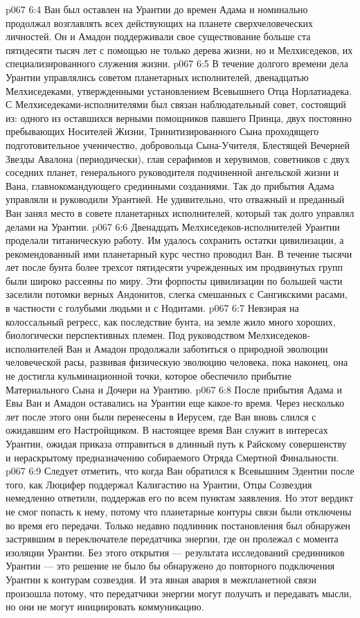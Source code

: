 \vs p067 6:4 Ван был оставлен на Урантии до времен Адама и номинально продолжал возглавлять всех действующих на планете сверхчеловеческих личностей. Он и Амадон поддерживали свое существование больше ста пятидесяти тысяч лет с помощью не только дерева жизни, но и Мелхиседеков, их специализированного служения жизни.
\vs p067 6:5 \pc В течение долгого времени дела Урантии управлялись советом планетарных исполнителей, двенадцатью Мелхиседеками, утвержденными установлением Всевышнего Отца Норлатиадека. С Мелхиседеками\hyp{}исполнителями был связан наблюдательный совет, состоящий из: одного из оставшихся верными помощников павшего Принца, двух постоянно пребывающих Носителей Жизни, Тринитизированного Сына проходящего подготовительное ученичество, добровольца Сына\hyp{}Учителя, Блестящей Вечерней Звезды Авалона (периодически), глав серафимов и херувимов, советников с двух соседних планет, генерального руководителя подчиненной ангельской жизни и Вана, главнокомандующего срединными созданиями. Так до прибытия Адама управляли и руководили Урантией. Не удивительно, что отважный и преданный Ван занял место в совете планетарных исполнителей, который так долго управлял делами на Урантии.
\vs p067 6:6 Двенадцать Мелхиседеков\hyp{}исполнителей Урантии проделали титаническую работу. Им удалось сохранить остатки цивилизации, а рекомендованный ими планетарный курс честно проводил Ван. В течение тысячи лет после бунта более трехсот пятидесяти учрежденных им продвинутых групп были широко рассеяны по миру. Эти форпосты цивилизации по большей части заселили потомки верных Андонитов, слегка смешанных с Сангикскими расами, в частности с голубыми людьми и с Нодитами.
\vs p067 6:7 Невзирая на колоссальный регресс, как последствие бунта, на земле жило много хороших, биологически перспективных племен. Под руководством Мелхиседеков\hyp{}исполнителей Ван и Амадон продолжали заботиться о природной эволюции человеческой расы, развивая физическую эволюцию человека, пока наконец, она не достигла кульминационной точки, которое обеспечило прибытие Материального Сына и Дочери на Урантию.
\vs p067 6:8 \pc После прибытия Адама и Евы Ван и Амадон оставались на Урантии еще какое\hyp{}то время. Через несколько лет после этого они были перенесены в Иерусем, где Ван вновь слился с ожидавшим его Настройщиком. В настоящее время Ван служит в интересах Урантии, ожидая приказа отправиться в длинный путь к Райскому совершенству и нераскрытому предназначению собираемого Отряда Смертной Финальности.
\vs p067 6:9 \pc Следует отметить, что когда Ван обратился к Всевышним Эдентии после того, как Люцифер поддержал Калигастию на Урантии, Отцы Созвездия немедленно ответили, поддержав его по всем пунктам заявления. Но этот вердикт не смог попасть к нему, потому что планетарные контуры связи были отключены во время его передачи. Только недавно подлинник постановления был обнаружен застрявшим в переключателе передатчика энергии, где он пролежал с момента изоляции Урантии. Без этого открытия --- результата исследований срединников Урантии --- это решение не было бы обнаружено до повторного подключения Урантии к контурам созвездия. И эта явная авария в межпланетной связи произошла потому, что передатчики энергии могут получать и передавать мысли, но они не могут инициировать коммуникацию.
